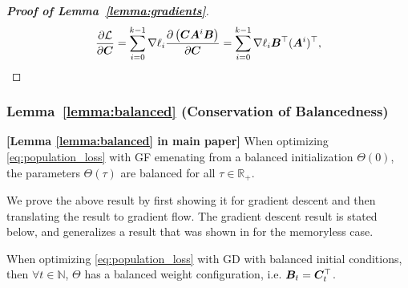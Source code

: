 \begin{proof}[\textbf{Proof of Lemma~\ref{lemma:gradients}}]
\begin{equation}
    \frac{\partial \mathcal{L}}{\partial {\bm{C}}} = \sum_{i=0}^{k-1} \nabla \ell_i \frac{\partial\left( {\bm{C}}{\bm{A}}^i{\bm{B}} \right)}{\partial {\bm{C}}} = \sum_{i=0}^{k-1} \nabla \ell_i {\bm{B}}^\top({\bm{A}}^i)^\top,
\end{equation}


\end{proof}


\subsubsection{Lemma~\ref{lemma:balanced} (Conservation of Balancedness)}\label{sec:lemma_balanced_proof}

\begin{lemma} \textbf{[Lemma \ref{lemma:balanced} in main paper]}
When optimizing \eqref{eq:population_loss} with GF emenating from a balanced initialization $\Theta(0)$, the parameters $\Theta(\tau)$ are balanced for all $\tau \in \mathbb{R}_+$.
\end{lemma}

We prove the above result by first showing it for gradient descent and then translating the result to gradient flow. The gradient descent result is stated below, and generalizes a result that was shown in \cite{cohen2022extrapolation} for the memoryless case.

\begin{lemma}\label{lemma:gd_invariance}
When optimizing \eqref{eq:population_loss} with GD with balanced initial conditions, then $\forall t\in\mathbb{N}$, $\Theta$ has a balanced weight configuration, i.e. ${\bm{B}}_t={\bm{C}}_t^\top$.
\end{lemma}


